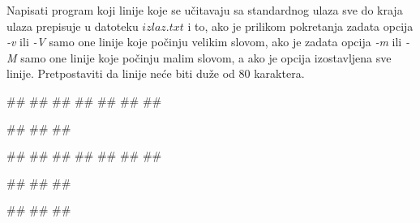 \begin{Exercise}[label=p3_09] 
 Napisati program koji linije koje se učitavaju sa standardnog ulaza sve do kraja ulaza prepisuje u datoteku $izlaz.txt$ i to, ako je prilikom pokretanja zadata opcija \textit{-v} ili \textit{-V} samo one linije koje počinju velikim slovom, ako je zadata opcija \textit{-m} ili \textit{-M} samo one linije koje počinju malim slovom, a ako je opcija izostavljena sve linije. Pretpostaviti da linije neće biti duže od 80 karaktera. \\
\begin{minitest}
\begin{upotreba}{1}
##
#\naslovInt#
##
##
##
##
##

##
##
##
\end{upotreba}
\end{minitest}
\begin{minitest}
\begin{upotreba}{2}
##
#\naslovInt#
##
##
##
##
##

##
##
##
\end{upotreba}
\end{minitest}
\begin{minitest}
\begin{upotreba}{3}
##
#\naslovInt#
##
\end{upotreba}
\end{minitest}
\end{Exercise}
\begin{Answer}[ref=p3_09]
\end{Answer}



           






